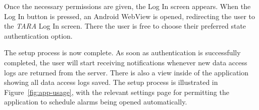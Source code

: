 Once the necessary permissions are given, the Log In screen appears. When the Log In button is pressed, an Android WebView is opened, redirecting the user to the \textit{TARA} Log In screen. There the user is free to choose their preferred state authentication option.

The setup process is now complete. As soon as authentication is successfully completed, the user will start receiving notifications whenever new data access logs are returned from the server. There is also a view inside of the application showing all data access logs saved. The setup process is illustrated in Figure~\ref{fig:app-usage}, with the relevant settings page for permitting the application to schedule alarms being opened automatically.

\begin{figure}[H]
\centering
\begin{minipage}{0.32\textwidth}
    \centering

\end{minipage}
\end{figure}
